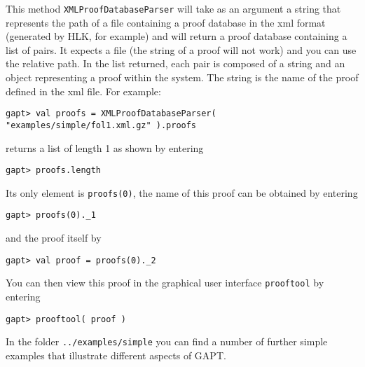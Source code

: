 \documentclass[a4paper,11pt]{article}
\newcommand{\cli}[1]{{\tt {#1}}}
\begin{document}
This method \texttt{XMLProofDatabaseParser} will take as an argument a string that represents the path of a file
containing a proof database in the xml format (generated by HLK, for example) and
will return a proof database containing a list 
of pairs. It expects a file (the string of a proof will not work) and you can use 
the relative path. In the list returned, each pair is composed of a string and 
an object representing a proof within the system. The string is the name of the 
proof defined in the xml file. For example:
%
\begin{lstlisting}
gapt> val proofs = XMLProofDatabaseParser( "examples/simple/fol1.xml.gz" ).proofs
\end{lstlisting}
%
returns a list of length 1 as shown by entering
%
\begin{lstlisting}
gapt> proofs.length
\end{lstlisting}
%
Its only element is \cli{proofs(0)}, the name of this proof can be obtained by
entering
%
\begin{lstlisting}
gapt> proofs(0)._1
\end{lstlisting}
%
and the proof itself by
%
\begin{lstlisting}
gapt> val proof = proofs(0)._2
\end{lstlisting}
%
You can then view this proof in the graphical user interface \texttt{prooftool} by 
entering
%
\begin{lstlisting}
gapt> prooftool( proof )
\end{lstlisting}
%
In the folder \cli{../examples/simple} you can find a number of further simple
examples that illustrate different aspects of GAPT.
\end{document}
